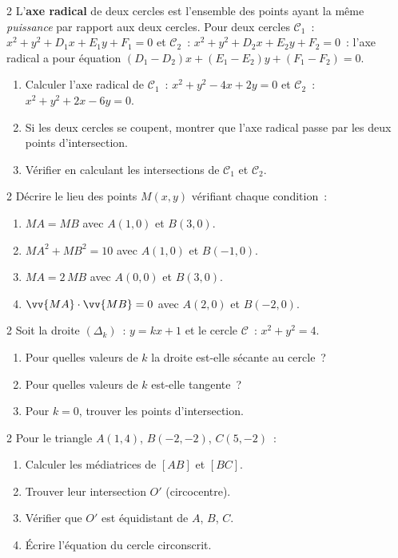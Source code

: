 \begin{exo}{2}
L'\textbf{axe radical} de deux cercles est l'ensemble des points ayant
la m\^eme \emph{puissance} par rapport aux deux cercles.
Pour deux cercles $\mathcal{C}_1$~: $x^2+y^2+D_1x+E_1y+F_1=0$
et $\mathcal{C}_2$~: $x^2+y^2+D_2x+E_2y+F_2=0$~:
l'axe radical a pour \'equation $(D_1-D_2)x+(E_1-E_2)y+(F_1-F_2)=0$.
\begin{enumerate}
  \item Calculer l'axe radical de $\mathcal{C}_1$~: $x^2+y^2-4x+2y=0$
        et $\mathcal{C}_2$~: $x^2+y^2+2x-6y=0$.
  \item Si les deux cercles se coupent, montrer que l'axe radical passe par
        les deux points d'intersection.
  \item V\'erifier en calculant les intersections de $\mathcal{C}_1$ et $\mathcal{C}_2$.
\end{enumerate}
\end{exo}

\begin{exo}{2}
D\'ecrire le lieu des points $M(x,y)$ v\'erifiant chaque condition~:
\begin{enumerate}
  \item $MA = MB$ avec $A(1,0)$ et $B(3,0)$.
  \item $MA^2 + MB^2 = 10$ avec $A(1,0)$ et $B(-1,0)$.
  \item $MA = 2\,MB$ avec $A(0,0)$ et $B(3,0)$.
  \item $\vv{MA}\cdot\vv{MB}=0$ avec $A(2,0)$ et $B(-2,0)$.
\end{enumerate}
\end{exo}

\begin{exo}{2}
Soit la droite $(\Delta_k)$~: $y=kx+1$ et le cercle $\mathcal{C}$~: $x^2+y^2=4$.
\begin{enumerate}
  \item Pour quelles valeurs de $k$ la droite est-elle s\'ecante au cercle~?
  \item Pour quelles valeurs de $k$ est-elle tangente~?
  \item Pour $k=0$, trouver les points d'intersection.
\end{enumerate}
\end{exo}

\begin{exo}{2}
Pour le triangle $A(1,4)$, $B(-2,-2)$, $C(5,-2)$~:
\begin{enumerate}
  \item Calculer les m\'ediatrices de $[AB]$ et $[BC]$.
  \item Trouver leur intersection $O'$ (circocentre).
  \item V\'erifier que $O'$ est \'equidistant de $A$, $B$, $C$.
  \item \'Ecrire l'\'equation du cercle circonscrit.
\end{enumerate}
\end{exo}

